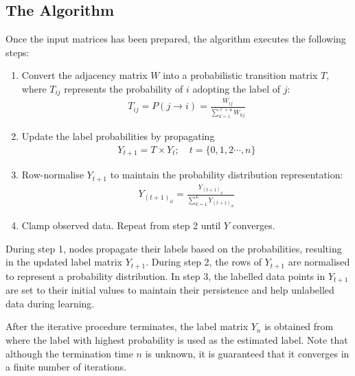\subsection{The Algorithm}
\par
Once the input matrices has been prepared, the algorithm executes the following steps:
\begin{enumerate}
    \item Convert the adjacency matrix $W$ into a probabilistic transition matrix $T$, where $T_{ij}$ represents the probability of $i$ adopting the label of $j$:
    \begin{align*}
        T_{ij} = P(j \xrightarrow{} i) = \frac{W_{ij}}{\sum_{k=1}^{\ell+u}W_{kj}}
    \end{align*}
    
    \item Update the label probabilities by propagating 
    \begin{align*}
        Y_{t+1} = T\times Y_t;\quad t = \{0,1,2\cdots,n\}
    \end{align*}
    \item Row-normalise $Y_{t+1}$ to maintain the probability distribution representation:
    \begin{align*}
        Y_{{(t+1)}_{il}} = \frac{Y_{{(t+1)}_{il}}}{\sum_{k=1}^{L}Y_{{(t+1)}_{ik}}}
    \end{align*}
    \item Clamp observed data. Repeat from step 2 until $Y$ converges.
\end{enumerate}

During step 1, nodes propagate their labels based on the probabilities, resulting in the updated label matrix $Y_{t+1}$. During step 2, the rows of $Y_{t+1}$ are normalised to represent a probability distribution. In step 3, the labelled data points in $Y_{t+1}$ are set to their initial values to maintain their persistence and help unlabelled data during learning.

\par
After the iterative procedure terminates, the label matrix $Y_n$ is obtained from where the label with highest probability is used as the estimated label. Note that although the termination time $n$ is unknown, it is guaranteed that it converges in a finite number of iterations.\\

